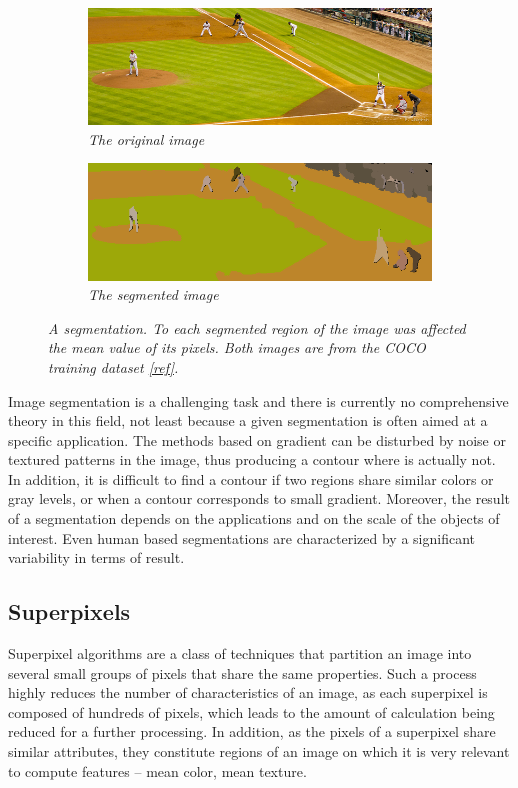 \documentclass{article}
\begin{document}
        \begin{figure}[!ht]
        \centering
        \begin{subfigure}{.49\linewidth}
            \centering
            \includegraphics[width=0.9\linewidth]{pics/img_segm1.jpg}
            \caption{\textit{The original image}}
        \end{subfigure}
        \begin{subfigure}{.49\linewidth}
            \centering
            \includegraphics[width=0.9\linewidth]{pics/img_segm2.png}
            \caption{\textit{The segmented image}}
        \end{subfigure}
            \caption{\textit{A segmentation. To each segmented region of the image was affected the mean value of its pixels. Both images are from the COCO training dataset \ref{ref}.}}
            \label{fig:segm}
        \end{figure}

        Image segmentation is a challenging task and there is currently no comprehensive theory in this field, not least because a given segmentation is often aimed at a specific application. The methods based on gradient can be disturbed by noise or textured patterns in the image, thus producing a contour where is actually not. In addition, it is difficult to find a contour if two regions share similar colors or gray levels, or when a contour corresponds to small gradient. Moreover, the result of a segmentation depends on the applications and on the scale of the objects of interest. Even human based segmentations are characterized by a significant variability in terms of result.

    \subsection{Superpixels}
        Superpixel algorithms are a class of techniques that partition an image into several small groups of pixels that share the same properties. Such a process highly reduces the number of characteristics of an image, as each superpixel is composed of hundreds of pixels, which leads to the amount of calculation being reduced for a further processing. In addition, as the pixels of a superpixel share similar attributes, they constitute regions of an image on which it is very relevant to compute features -- mean color, mean texture.
\end{document}
